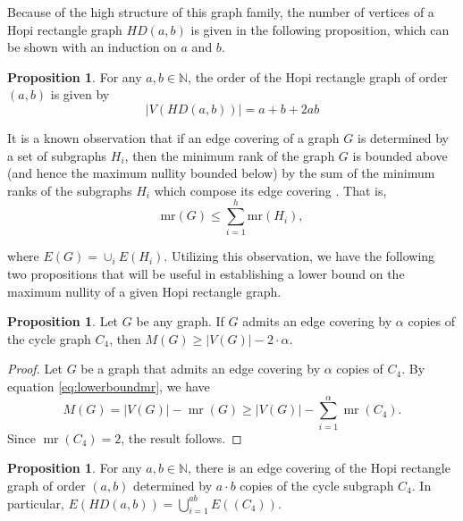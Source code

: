 \documentclass[11pt]{article}
\theoremstyle{plain} \newtheorem{question}{Question}
\theoremstyle{definition}
\newtheorem{prop}[thm]{Proposition}
\begin{document}
Because of the high structure of this graph family, the number of vertices of a Hopi rectangle graph $HD(a,b)$ is given in the following proposition, which can be shown with an induction on $a$ and $b$. 

\begin{prop}\label{prop: Order of HD(m,n)}
For any $a,b \in \mathbb{N}$, the order of the Hopi rectangle graph of order $(a,b)$ is given by 
\[|V(HD(a,b))| = a+b + 2ab \] 
\end{prop}

It is a known observation that if an edge covering of a graph $G$ is determined by a set of subgraphs $H_i$, then the minimum rank of the graph $G$ is bounded above (and hence the maximum nullity bounded below) by the sum of the minimum ranks of the subgraphs $H_i$ which compose its edge covering \cite{FallatHogbenObservation}. That is,
\begin{equation}\label{eq:lowerboundmr}
    \text{mr}(G)\leq \sum_{i=1}^h \text{mr}(H_i),
\end{equation}

\noindent where $E(G) = \cup_i E(H_i)$. Utilizing this observation, we have the following two propositions that will be useful in establishing a lower bound on the maximum nullity of a given Hopi rectangle graph.


\begin{prop}\label{prop:edgecoverbounds}
    Let $G$ be any graph. If $G$ admits an edge covering by $\alpha$ copies of the cycle graph $C_4$, then $M(G) \ge |V(G)| - 2\cdot \alpha$.
\end{prop}

\begin{proof}
Let $G$ be a graph that admits an edge covering by $\alpha$ copies of $C_4$. By equation \ref{eq:lowerboundmr}, we have \[M(G) = |V(G)| - \operatorname{mr}(G) \ge |V(G)|  - \sum\limits_{i=1}^\alpha \operatorname{mr}(C_4).\] Since $\operatorname{mr}(C_4) = 2$, the result follows.
\end{proof}

\begin{prop}\label{prop:Edge Cover HD(m,n)}
For any $a,b\in\mathbb{N}$, there is an edge covering of the Hopi rectangle graph of order $(a,b)$ determined by $a\cdot b$ copies of the cycle subgraph $C_4$. In particular, $E(HD(a,b)) = \bigcup\limits_{i=1}^{ab} E((C_4))$.                                 
\end{prop}
\end{document}
